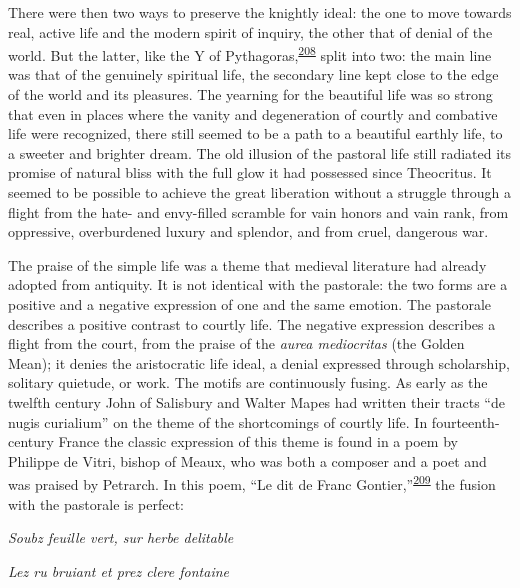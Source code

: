 There were then two ways to preserve the knightly ideal: the one to move
towards real, active life and the modern spirit of inquiry, the other
that of denial of the world. But the latter, like the Y of
Pythagoras,\textsuperscript{\protect\hypertarget{10_Chapter_Three__THE_HEROIC_DREAM.xhtmlux5cux23id_1521}{\protect\hyperlink{23_NOTES.xhtmlux5cux23id_1522}{208}}}
split into two: the main line was that of the genuinely spiritual life,
the secondary line kept close to the edge of the world and its
pleasures. The yearning for the beautiful life was so strong that even
in places where the vanity and degeneration of courtly and combative
life were recognized, there still seemed to be a path to a beautiful
earthly life, to a sweeter and brighter dream. The old illusion of the
pastoral life still radiated its promise of natural bliss with the full
glow it had possessed since Theocritus. It seemed to be possible to
achieve the great liberation without a struggle through a flight from
the hate- and envy-filled scramble for vain honors and vain rank, from
oppressive, overburdened luxury and splendor, and from cruel, dangerous
war.

The praise of the simple life was a theme that medieval literature had
already adopted from antiquity. It is not identical with the pastorale:
the two forms are a positive and a negative expression of one and the
same emotion. The pastorale describes a positive contrast to courtly
life. The negative expression describes a flight
\protect\hypertarget{10_Chapter_Three__THE_HEROIC_DREAM.xhtmlux5cux23page_121}{}{}from
the court, from the praise of the \emph{aurea mediocritas} (the Golden
Mean); it denies the aristocratic life ideal, a denial expressed through
scholarship, solitary quietude, or work. The motifs are continuously
fusing. As early as the twelfth century John of Salisbury and Walter
Mapes had written their tracts ``de nugis curialium'' on the theme of
the shortcomings of courtly life. In fourteenth-century France the
classic expression of this theme is found in a poem by Philippe de
Vitri, bishop of Meaux, who was both a composer and a poet and was
praised by Petrarch. In this poem, ``Le dit de Franc
Gontier,''\textsuperscript{\protect\hypertarget{10_Chapter_Three__THE_HEROIC_DREAM.xhtmlux5cux23id_1519}{\protect\hyperlink{23_NOTES.xhtmlux5cux23id_1520}{209}}}
the fusion with the pastorale is perfect:

\emph{Soubz feuille vert, sur herbe delitable}

\emph{Lez ru bruiant et prez clere fontaine}

